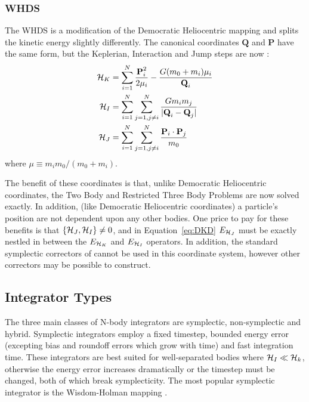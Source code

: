 \subsubsection{WHDS}
The WHDS is a modification of the Democratic Heliocentric mapping and splits the kinetic energy slightly differently. 
The canonical coordinates $\textbf{Q}$ and $\textbf{P}$ have the same form, but the Keplerian, Interaction and Jump steps are now \citep{Laskar1995, Wisdom2006, Hernandez2016}:
\begin{align}
\begin{split}
\mathcal{H}_K &= \sum_{i=1}^N \frac{\textbf{P}_i^2}{2\mu_i} - \frac{G(m_0 + m_i)\mu_i}{\textbf{Q}_i} \\
\mathcal{H}_I &= \sum_{i=1}^{N}\sum_{j=1,j \ne i}^N \frac{Gm_im_j}{|\textbf{Q}_i - \textbf{Q}_j|} \\
\mathcal{H}_J &= \sum_{i=1}^{N}\sum_{j=1,j \ne i}^N \frac{\textbf{P}_i \cdot \textbf{P}_j}{m_0}
\end{split}
\end{align}
where $\mu \equiv m_im_0/(m_0 + m_i)$.

The benefit of these coordinates is that, unlike Democratic Heliocentric coordinates, the Two Body and Restricted Three Body Problems are now solved exactly. 
In addition, (like Democratic Heliocentric coordinates) a particle's position are not dependent upon any other bodies. 
One price to pay for these benefits is that $\{\mathcal{H}_J, \mathcal{H}_I\} \ne 0$, and in Equation~\ref{eq:DKD} $E_{\mathcal{H}_J}$ must be exactly nestled in between the $E_{\mathcal{H}_K}$ and $E_{\mathcal{H}_I}$ operators.
In addition, the standard symplectic correctors of \citet{Wisdom2006} cannot be used in this coordinate system, however other correctors may be possible to construct. 

\subsection{Integrator Types}
\label{sec:inttypes}
The three main classes of N-body integrators are symplectic, non-symplectic and hybrid. 
Symplectic integrators employ a fixed timestep, bounded energy error (excepting bias and roundoff errors which grow with time) and fast integration time.
These integrators are best suited for well-separated bodies where $\mathcal{H}_I \ll \mathcal{H}_k$, otherwise the energy error increases dramatically or the timestep must be changed, both of which break symplecticity. 
The most popular symplectic integrator is the Wisdom-Holman mapping \citep{Wisdom1991}.

